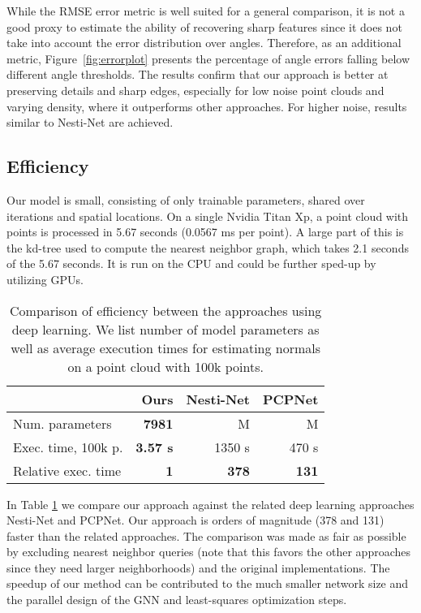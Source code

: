 \documentclass[10pt,twocolumn,letterpaper]{article}
\begin{document}
While the RMSE error metric is well suited for a general comparison, it is not 
a good proxy to estimate the ability of recovering sharp features since it does not
take into account the error distribution over angles. Therefore, as an additional metric, 
Figure~\ref{fig:errorplot} presents the percentage of angle errors falling below 
different angle thresholds. 
The results confirm that our approach is better at preserving details and sharp
edges, especially for low noise point clouds and varying density, where it 
outperforms other approaches. For higher noise, results similar to 
Nesti-Net are achieved.


\subsection{Efficiency}
\label{sec:complexity}
Our model is small, consisting of only  trainable parameters,
shared over iterations and spatial locations. 
On a single Nvidia Titan Xp, a point cloud with  points is 
processed in 5.67 seconds (0.0567 ms per point). 
A large part of this is the kd-tree used to compute the nearest
neighbor graph, which takes 2.1 seconds of the 5.67 seconds.
It is run on the CPU and could be further sped-up by utilizing GPUs.

\begin{table}[h]
\small
  \centering
\begin{tabular}{lrrr}
      \toprule
 & Ours    & Nesti-Net \cite{Ben-Shabat:2018} &  PCPNet \cite{Guerrero:2018}  \\ \midrule
Num. parameters     & \textbf{7981} & M &   M \\ 
Exec. time, 100k p.  & \textbf{3.57 s}  & 1350 s  & 470 s  \\ 
Relative exec. time  & \textbf{1} &  \textbf{378}  & \textbf{131} \\ 
\bottomrule
\end{tabular}
\caption{Comparison of efficiency between the approaches using deep learning. We list number of model parameters as well as average execution times for estimating normals on a point cloud with 100k points.}
\label{tab:complexity}
\end{table}
\vspace{-3mm}

In Table \ref{tab:complexity} we compare our approach against the related deep learning approaches Nesti-Net and PCPNet. Our approach is orders of magnitude (378 and 131) faster than the related approaches. The comparison was made as fair as possible by excluding nearest neighbor queries (note that this favors the other approaches since they need larger neighborhoods) and the original implementations.
The speedup of our method can be contributed to the much smaller network size and the parallel design of the GNN and least-squares optimization steps.
\end{document}
